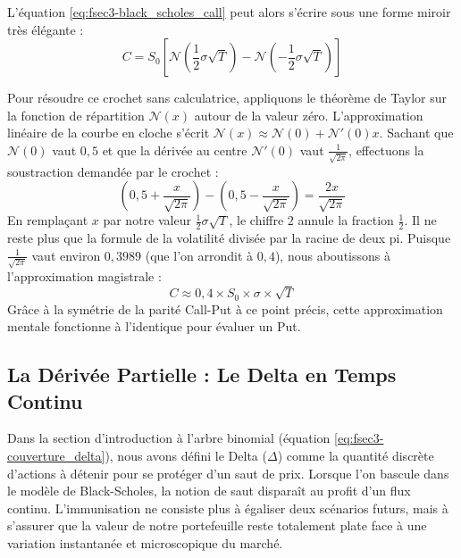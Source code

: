 L'équation \ref{eq:fsec3-black_scholes_call} peut alors s'écrire sous une forme miroir très élégante :
\begin{equation}
    \label{eq:fsec3-call_atm_intermediaire}
    C = S_0 \left[ \mathcal{N}\left( \frac{1}{2}\sigma \sqrt{T} \right) - \mathcal{N}\left( -\frac{1}{2}\sigma \sqrt{T} \right) \right]
\end{equation}

Pour résoudre ce crochet sans calculatrice, appliquons le théorème de Taylor sur la fonction de répartition $\mathcal{N}(x)$ autour de la valeur zéro. L'approximation linéaire de la courbe en cloche s'écrit $\mathcal{N}(x) \approx \mathcal{N}(0) + \mathcal{N}'(0)x$.
Sachant que $\mathcal{N}(0)$ vaut $0,5$ et que la dérivée au centre $\mathcal{N}'(0)$ vaut $\frac{1}{\sqrt{2\pi}}$, effectuons la soustraction demandée par le crochet :
\begin{equation}
    \label{eq:fsec3-soustraction_taylor}
    \left( 0,5 + \frac{x}{\sqrt{2\pi}} \right) - \left( 0,5 - \frac{x}{\sqrt{2\pi}} \right) = \frac{2x}{\sqrt{2\pi}}
\end{equation}
En remplaçant $x$ par notre valeur $\frac{1}{2}\sigma \sqrt{T}$, le chiffre $2$ annule la fraction $\frac{1}{2}$. Il ne reste plus que la formule de la volatilité divisée par la racine de deux pi. Puisque $\frac{1}{\sqrt{2\pi}}$ vaut environ $0,3989$ (que l'on arrondit à $0,4$), nous aboutissons à l'approximation magistrale :
\begin{equation}
    \label{eq:fsec3-approximation_atm}
    C \approx 0,4 \times S_0 \times \sigma \times \sqrt{T}
\end{equation}
Grâce à la symétrie de la parité Call-Put à ce point précis, cette approximation mentale fonctionne à l'identique pour évaluer un Put.

\subsection{La Dérivée Partielle : Le Delta en Temps Continu}

Dans la section d'introduction à l'arbre binomial (équation \ref{eq:fsec3-couverture_delta}), nous avons défini le Delta ($\Delta$) comme la quantité discrète d'actions à détenir pour se protéger d'un saut de prix. 
Lorsque l'on bascule dans le modèle de Black-Scholes, la notion de saut disparaît au profit d'un flux continu. L'immunisation ne consiste plus à égaliser deux scénarios futurs, mais à s'assurer que la valeur de notre portefeuille reste totalement plate face à une variation instantanée et microscopique du marché.

